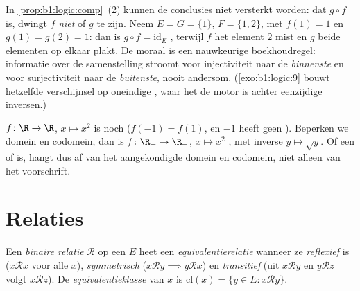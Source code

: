 \begin{example}\label{ex:b1:logic:compsharp}
In \cref{prop:b1:logic:comp}~(2) kunnen de conclusies niet versterkt
worden: dat $g \circ f$  is, dwingt $f$ \emph{niet} 
of $g$  te zijn. Neem $E = G = \{1\}$, $F = \{1, 2\}$, met
$f(1) = 1$ en $g(1) = g(2) = 1$: dan is $g \circ f = \mathrm{id}_E$
, terwijl $f$ het element $2$ mist en $g$ beide elementen op
elkaar plakt. De moraal is een nauwkeurige boekhoudregel: informatie over
de samenstelling stroomt voor injectiviteit naar de \emph{binnenste}
 en voor surjectiviteit naar de \emph{buitenste}, nooit
andersom. (\cref{exo:b1:logic:9} bouwt hetzelfde verschijnsel op oneindige
, waar het de motor is achter eenzijdige inversen.)
\end{example}

\begin{example}\label{ex:b1:logic:injexamples}
$f \colon \R \to \R$, $x \mapsto x^2$ is  noch 
($f(-1) = f(1)$, en $-1$ heeft geen ). Beperken we domein en
codomein, dan is $f \colon \R_+ \to \R_+$, $x \mapsto x^2$ , met
inverse $y \mapsto \sqrt y$. Of een   of 
is, hangt dus af van het aangekondigde domein en codomein, niet alleen
van het voorschrift.
\end{example}

\section{Relaties}

\begin{definition}[Equivalentierelatie]\label{def:b1:logic:equiv}
Een \emph{binaire relatie} $\mathcal{R}$ op een  $E$ heet een
\emph{equivalentierelatie} wanneer ze
\emph{reflexief} is ($x \mathbin{\mathcal{R}} x$ voor alle $x$),
\emph{symmetrisch} ($x \mathbin{\mathcal{R}} y \implies y
\mathbin{\mathcal{R}} x$) en \emph{transitief} (uit $x
\mathbin{\mathcal{R}} y$ en $y \mathbin{\mathcal{R}} z$ volgt $x
\mathbin{\mathcal{R}} z$). De \emph{equivalentieklasse} van $x$ is
$\mathrm{cl}(x) = \{y \in E : x \mathbin{\mathcal{R}} y\}$.
\end{definition}

